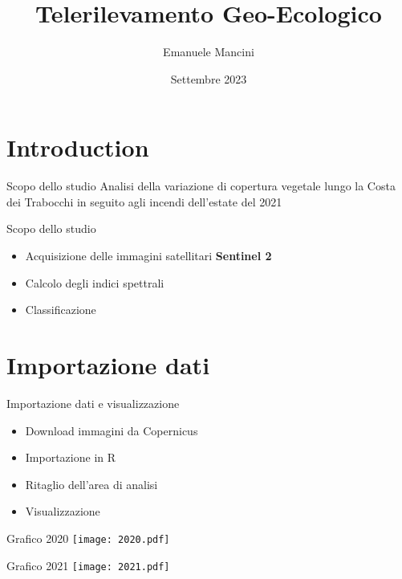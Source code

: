 \documentclass{beamer}
\title{Telerilevamento Geo-Ecologico}
\author{Emanuele Mancini}
\date{Settembre 2023}
\begin{document}
\maketitle

\section{Introduction}

\begin{frame}{Scopo dello studio}
Analisi della variazione di copertura vegetale lungo la Costa dei Trabocchi in seguito agli incendi dell'estate del 2021
\end{frame}

\begin{frame}{Scopo dello studio}
\begin{itemize}
    \item Acquisizione delle immagini satellitari \textbf{Sentinel 2}
    \item \pause Calcolo degli indici spettrali
    \item \pause Classificazione
\end{itemize}    
\end{frame}

\section{Importazione dati}

\begin{frame}{Importazione dati e visualizzazione}
\begin{itemize}
    \item Download immagini da Copernicus
    \item \pause Importazione in R
    \item \pause Ritaglio dell'area di analisi
    \item \pause Visualizzazione
\end{itemize}
    
\end{frame}

\begin{frame}{Grafico 2020}
\centering
\texttt{[image: 2020.pdf]}
\end{frame}

\begin{frame}{Grafico 2021}
\centering
\texttt{[image: 2021.pdf]}
\end{frame}
\end{document}
